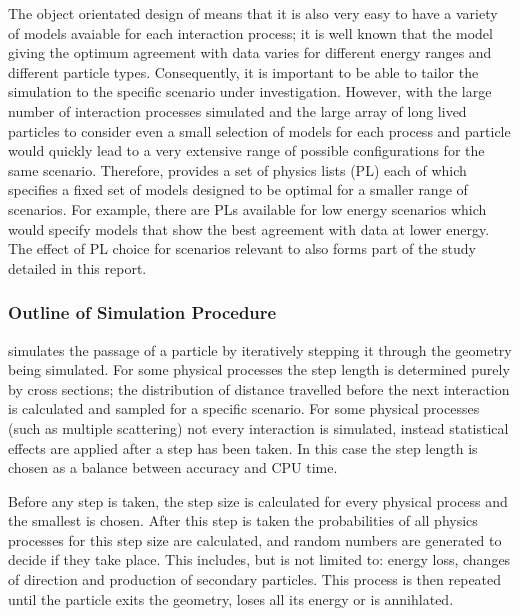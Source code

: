 The object orientated design of \geant means that it is also very easy to have a variety of models avaiable for each interaction process; it is well known that the model giving the optimum agreement with data varies for different energy ranges and different particle types.  Consequently, it is important to be able to tailor the simulation to the specific scenario under investigation.  However, with the large number of interaction processes simulated and the large array of long lived particles to consider even a small selection of models for each process and particle would quickly lead to a very extensive range of possible configurations for the same scenario.  Therefore, \geant provides a set of physics lists (PL) each of which specifies a fixed set of models designed to be optimal for a smaller range of scenarios.  For example, there are PLs available for low energy scenarios which would specify models that show the best agreement with data at lower energy.  The effect of PL choice for scenarios relevant to \lhcb also forms part of the study detailed in this report.

\subsubsection{Outline of \geant Simulation Procedure} \label{sec:steps}
\geant simulates the passage of a particle by iteratively stepping it through the geometry being simulated.  For some physical processes the step length is determined purely by cross sections; the distribution of distance travelled before the next interaction is calculated and sampled for a specific scenario.  For some physical processes (such as multiple scattering) not every interaction is simulated, instead statistical effects are applied after a step has been taken.  In this case the step length is chosen as a balance between accuracy and CPU time.

Before any step is taken, the step size is calculated for every physical process and the smallest is chosen.  After this step is taken the probabilities of all physics processes for this step size are calculated, and random numbers are generated to decide if they take place.  This includes, but is not limited to: energy loss, changes of direction and production of secondary particles.  This process is then repeated until the particle exits the geometry, loses all its energy or is annihlated.

